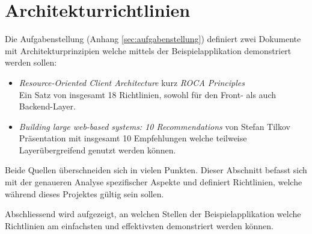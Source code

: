 \section{Architekturrichtlinien}
\label{sec:architekturrichtlinien}

Die Aufgabenstellung (Anhang \ref{sec:aufgabenstellung}) definiert zwei Dokumente mit Architekturprinzipien welche mittels der Beispielapplikation demonstriert werden sollen:

\begin{itemize}
	\item \textit{Resource-Oriented Client Architecture} kurz \textit{ROCA Principles} \cite{ROCA}\\
	Ein Satz von insgesamt 18 Richtlinien, sowohl für den Front- als auch Backend-Layer.
	\item \textit{Building large web-based systems: 10 Recommendations} von Stefan Tilkov \cite{TilkovSlides}\\
	Präsentation mit insgesamt 10 Empfehlungen welche teilweise Layerübergreifend genutzt werden können.
\end{itemize}

Beide Quellen überschneiden sich in vielen Punkten. Dieser Abschnitt befasst sich mit der genaueren Analyse spezifischer Aspekte und definiert Richtlinien, welche während dieses Projektes gültig sein sollen.

Abschliessend wird aufgezeigt, an welchen Stellen der Beispielapplikation welche Richtlinien am einfachsten und effektivsten demonstriert werden können.








\newpage
